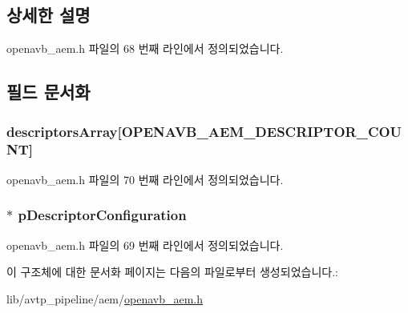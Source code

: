\subsection{상세한 설명}


openavb\+\_\+aem.\+h 파일의 68 번째 라인에서 정의되었습니다.



\subsection{필드 문서화}
\subsubsection[{\texorpdfstring{descriptors\+Array}{descriptorsArray}}]{ descriptors\+Array\mbox{[}{\bf O\+P\+E\+N\+A\+V\+B\+\_\+\+A\+E\+M\+\_\+\+D\+E\+S\+C\+R\+I\+P\+T\+O\+R\+\_\+\+C\+O\+U\+NT}\mbox{]}}\hypertarget{structopenavb__aem__configuration__t_ac13acdbe38f2c36440cba7ef1a7aed17}{}\label{structopenavb__aem__configuration__t_ac13acdbe38f2c36440cba7ef1a7aed17}


openavb\+\_\+aem.\+h 파일의 70 번째 라인에서 정의되었습니다.

\subsubsection[{\texorpdfstring{p\+Descriptor\+Configuration}{pDescriptorConfiguration}}]{$\ast$ p\+Descriptor\+Configuration}\hypertarget{structopenavb__aem__configuration__t_a4abea387cf415fe116337d5cc7daa7b0}{}\label{structopenavb__aem__configuration__t_a4abea387cf415fe116337d5cc7daa7b0}


openavb\+\_\+aem.\+h 파일의 69 번째 라인에서 정의되었습니다.



이 구조체에 대한 문서화 페이지는 다음의 파일로부터 생성되었습니다.\+:\begin{DoxyCompactItemize}
\item 
lib/avtp\+\_\+pipeline/aem/\hyperlink{openavb__aem_8h}{openavb\+\_\+aem.\+h}\end{DoxyCompactItemize}
